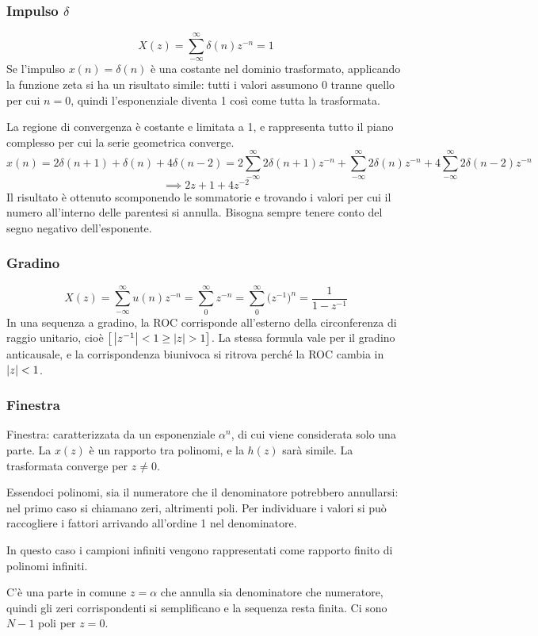 \subsubsection{Impulso $\delta$}
$$X(z) = \sum_{-\infty}^{\infty} \delta(n) z^{-n} = 1$$
Se l'impulso $x(n) = \delta(n)$ è una costante nel dominio trasformato, applicando la funzione zeta si ha un risultato simile: tutti i valori assumono 0 tranne quello per cui $n = 0$, quindi l'esponenziale diventa 1 così come tutta la trasformata. 

La regione di convergenza è costante e limitata a 1, e rappresenta tutto il piano complesso per cui la serie geometrica converge.
$$x(n) = 2\delta(n+1) + \delta(n) + 4\delta(n-2) = 2\sum_{-\infty}^{\infty}2\delta(n+1)z^{-n} + \sum_{-\infty}^{\infty}2\delta(n)z^{-n} + 4\sum_{-\infty}^{\infty}2\delta(n-2)z^{-n}$$
$$\implies 2z + 1 + 4z^{-2}$$
Il risultato è ottenuto scomponendo le sommatorie e trovando i valori per cui il numero all'interno delle parentesi si annulla. Bisogna sempre tenere conto del segno negativo dell'esponente.

\subsubsection{Gradino}
$$X(z) = \sum_{-\infty}^{\infty}u(n)z^{-n} = \sum_{0}^{\infty}z^{-n} = \sum_{0}^{\infty}\big(z^{-1}\big)^n = \frac{1}{1 - z^{-1}}$$
In una sequenza a gradino, la ROC corrisponde all'esterno della circonferenza di raggio unitario, cioè $\big[\left|z^{-1}\right| < 1 \geq \left|z\right| > 1\big]$. La stessa formula vale per il gradino anticausale, e la corrispondenza biunivoca si ritrova perché la ROC cambia in $\left|z\right| < 1$.

\subsubsection{Finestra}
Finestra: caratterizzata da un esponenziale $\alpha^n$, di cui viene considerata solo una parte. La $x(z)$ è un rapporto tra polinomi, e la $h(z)$ sarà simile. La trasformata converge per $z \neq 0$.

Essendoci polinomi, sia il numeratore che il denominatore potrebbero annullarsi: nel primo caso si chiamano zeri, altrimenti poli. Per individuare i valori si può raccogliere i fattori arrivando all'ordine 1 nel denominatore.

In questo caso i campioni infiniti vengono rappresentati come rapporto finito di polinomi infiniti.

C'è una parte in comune $z = \alpha$ che annulla sia denominatore che numeratore, quindi gli zeri corrispondenti si semplificano e la sequenza resta finita. Ci sono $N - 1$ poli per $z = 0$.

